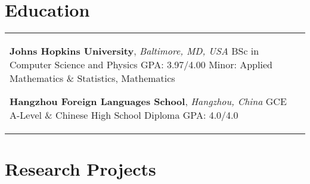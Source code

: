 \documentclass[10pt]{article} %
\begin{document}

\section{Education} 





\begin{supertabular}{L{4cm}@{\hskip 0.3in}L{13cm}} %

	
	
	
	{\textbf{Johns Hopkins University}, \textit{Baltimore, MD, USA}} %
	{BSc in Computer Science and Physics} %
	{GPA: 3.97/4.00} %
	{Minor: Applied Mathematics \& Statistics, Mathematics} %
	
	
	{\textbf{Hangzhou Foreign Languages School}, \textit{Hangzhou, China}} %
	{GCE A-Level \& Chinese High School Diploma}
        {GPA: 4.0/4.0}
        { }
	

\end{supertabular}
\vspace{-0.3cm}

\section{Research Projects}
\end{document}
